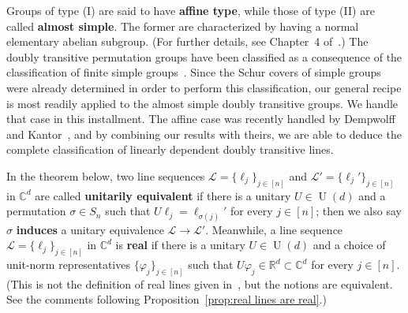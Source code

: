 \documentclass[11pt]{article}
\theoremstyle{definition}
\numberwithin{equation}{section}
\begin{document}
Groups of type (I) are said to have \textbf{affine type}, while those of type (II) are called \textbf{almost simple}.
The former are characterized by having a normal elementary abelian subgroup.
(For further details, see Chapter~4 of~\cite{DixonMortimer:96}.)
The doubly transitive permutation groups have been classified as a consequence of the classification of finite simple groups~\cite{Cameron:81}.
Since the Schur covers of simple groups were already determined in order to perform this classification, our general recipe is most readily applied to the almost simple doubly transitive groups.
We handle that case in this installment.
The affine case was recently handled by Dempwolff and Kantor~\cite{DempwolffK:23}, and by combining our results with theirs, we are able to deduce the complete classification of linearly dependent doubly transitive lines.

In the theorem below, two line sequences $\mathscr{L} = \{ \ell_j \}_{j\in [n]}$ and $\mathscr{L}' = \{ \ell_j' \}_{j\in [n]}$ in $\mathbb{C}^d$ are called \textbf{unitarily equivalent} if there is a unitary $U \in \operatorname{U}(d)$ and a permutation $\sigma \in S_n$ such that $U \ell_j = \ell_{\sigma(j)}'$ for every $j \in [n]$; then we also say $\sigma$ \textbf{induces} a unitary equivalence $\mathscr{L} \to \mathscr{L}'$.
Meanwhile, a line sequence $\mathscr{L} = \{ \ell_j \}_{j\in [n]}$ in $\mathbb{C}^d$ is \textbf{real} if there is a unitary $U \in \operatorname{U}(d)$ and a choice of unit-norm representatives $\{ \varphi_j \}_{j\in [n]}$ such that $U \varphi_j \in \mathbb{R}^d \subset \mathbb{C}^d$ for every $j \in [n]$.
(This is not the definition of real lines given in~\cite{IversonM:18}, but the notions are equivalent.
See the comments following Proposition~\ref{prop:real lines are real}.)
\end{document}
